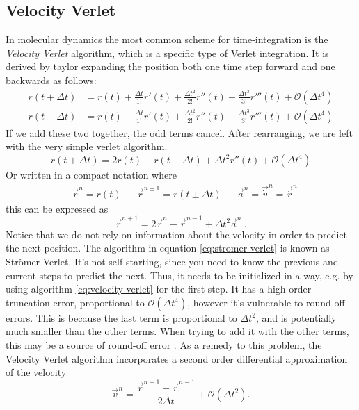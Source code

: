 \documentclass[twoside,english]{uiofysmaster}
\begin{document}
\subsection*{Velocity Verlet}
In molecular dynamics the most common scheme for time-integration is the \textit{Velocity Verlet} algorithm, which is a specific type of Verlet integration.
It is derived by taylor expanding the position both one time step forward and one backwards as follows: 
\begin{align}
	r(t+\Delta t) &= r(t) + \frac{\Delta t}{1!}r'(t) + \frac{\Delta t^2}{2!}r''(t) + \frac{\Delta t^3}{3!}r'''(t) + \mathcal{O}(\Delta t^4)\\[1ex]
	r(t-\Delta t) &= r(t) - \frac{\Delta t}{1!}r'(t) + \frac{\Delta t^2}{2!}r''(t) - \frac{\Delta t^3}{3!}r'''(t) + \mathcal{O}(\Delta t^4)
\end{align}
If we add these two together, the odd terms cancel. 
After rearranging, we are left with the very simple verlet algorithm. 
\begin{equation}
r(t+\Delta t) = 2r(t) - r(t-\Delta t) + \Delta t^2r''(t) + \mathcal{O}(\Delta t^4)
\end{equation}
Or written in a compact notation where
\begin{align}
	&\vec{r}^n = r(t)& &\vec{r}^{n\pm 1} = r(t\pm \Delta t)&  &\vec{a}^n =  \vec{\dot{v}}^n = \vec{\ddot{r}}^n
\end{align}
this can be expressed as
\begin{equation}\label{eq:stromer-verlet}
\vec{r}^{n+1} = 2\vec{r}^n - \vec{r}^{n-1} + \Delta t^2\vec{a}^n ~.
\end{equation}
Notice that we do not rely on information about the velocity in order to predict the next position. 
The algorithm in equation \eqref{eq:stromer-verlet} is known as Strömer-Verlet. 
It's not self-starting, since you need to know the previous and current steps to predict the next. 
Thus, it needs to be initialized in a way, e.g. by using algorithm \eqref{eq:velocity-verlet} for the first step. 
It has a high order truncation error, proportional to $\mathcal{O}(\Delta t^4)$, however it's vulnerable to round-off errors. 
This is because the last term is proportional to $\Delta t^2$, and is potentially much smaller than the other terms.
When trying to add it with the other terms, this may be a source of round-off error \cite{MATINF1100}. 
As a remedy to this problem, the Velocity Verlet algorithm incorporates a second order differential approximation of the velocity
 \begin{equation}\label{eq:velocity-verlet-velocity}
\vec{v}^n = \frac{ \vec{r}^{n+1}-\vec{r}^{n-1} }{2\Delta t} + \mathcal{O}(\Delta t^2).
\end{equation}
\end{document}
